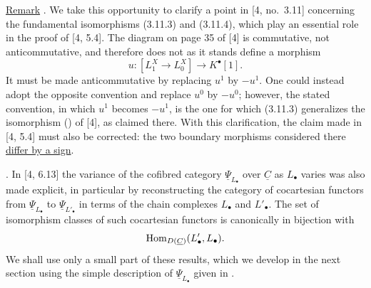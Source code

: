 \underline{Remark} . We take this opportunity to clarify a
point in [4, no.~3.11] concerning the fundamental isomorphisms
(3.11.3) and (3.11.4), which play an essential role in the proof of
[4, 5.4]. The diagram on page 35 of [4] is commutative, not
anticommutative, and therefore does not as it stands define a
morphism
\[
 u:[L^X_1\longrightarrow L^X_0]\longrightarrow K^\bullet[1].
\]
It must be made anticommutative by replacing $u^1$ by $-u^1$. One
could instead adopt the opposite convention and replace $u^0$ by
$-u^0$; however, the stated convention, in which $u^1$ becomes
$-u^1$, is the one for which (3.11.3) generalizes the isomorphism
() of [4], as claimed there. With this clarification, the claim
made in [4, 5.4] must also be corrected: the two boundary morphisms
considered there \underline{differ by a sign}.

. In [4, 6.13] the variance of the cofibred category
$\underline\Psi_{L_\bullet}$ over $\underline C$ as $L_\bullet$
varies was also made explicit, in particular by reconstructing the
category of cocartesian functors from $\underline\Psi_{L_\bullet}$
to $\underline\Psi_{L'_\bullet}$ in terms of the chain complexes
$L_\bullet$ and $L'_\bullet$. The set of isomorphism classes of such
cocartesian functors is canonically in bijection with
\[
 \Hom_{D(\underline C)}(L'_\bullet,L_\bullet).
\]
We shall use only a small part of these results, which we develop in
the next section using the simple description of
$\underline\Psi_{L_\bullet}$ given in .
